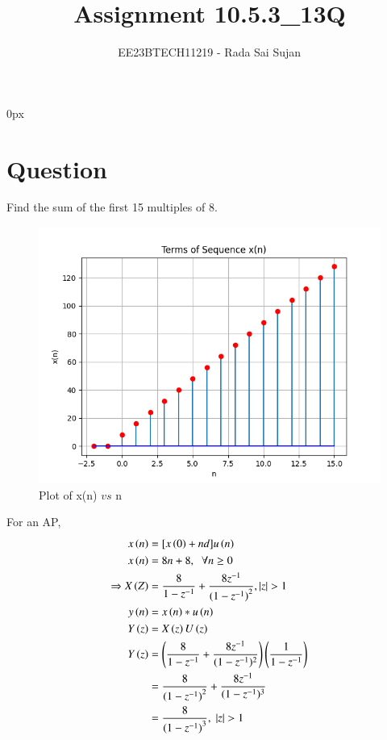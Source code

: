 \documentclass[journal,12pt,twocolumn]{IEEEtran}
\theoremstyle{remark}
\begin{document}
\parindent 0px

\title{Assignment 10.5.3\_13Q}
\author{EE23BTECH11219 - Rada Sai Sujan$^{}$%
}
\maketitle
\newpage
\bigskip
\section*{Question}
Find the sum of the first 15 multiples of 8. \\
\solution

    \begin{figure}[ht]
        \centering
        \includegraphics[width=\columnwidth]{figs/a.png}
        \caption{Plot of x(n) $vs$ n}
        \label{fig:10.5.3.13.1}
    \end{figure}
For an AP,
\begin{align}
    x\brak n &= [x\brak 0 + nd]u\brak n   \\
    x\brak n&=8n+8 , \;\; \forall n\geq0 \\
    \Rightarrow X\brak Z &= \dfrac{8}{1-z^{-1}} + \dfrac{8z^{-1}}{{(1-z^{-1})}^{2}}, |z|>1 \\
    y\brak{n}&=x\brak{n}\ast u\brak{n}\\
    Y\brak{z}&=X\brak{z}U\brak{z}   \\
    Y\brak{z}&=\brak{\dfrac{8}{1-z^{-1}} + \dfrac{8z^{-1}}{(1-z^{-1})^{2}}}\brak{\dfrac{1}{1-z^{-1}}}   \\
    &=\dfrac{8}{({1-z^{-1})}^{2}} + \dfrac{8z^{-1}}{(1-z^{-1})^{3}} \\
    &=\dfrac{8}{({1-z^{-1})}^{3}} , \;|z|>1
 \end{align}
\end{document}
